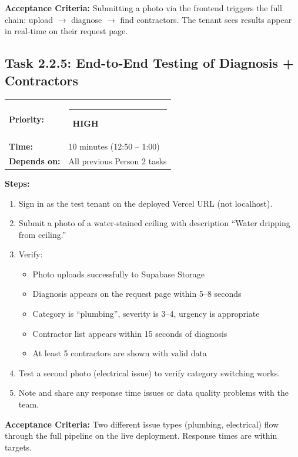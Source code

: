 \documentclass[11pt, a4paper]{article}
\newcommand{\highpri}{\textcolor{highamber}{\rule{6pt}{6pt}}~\textcolor{highamber}{\scriptsize\textbf{HIGH}}}
\begin{document}
\textbf{Acceptance Criteria:} Submitting a photo via the frontend triggers the full chain: upload $\rightarrow$ diagnose $\rightarrow$ find contractors. The tenant sees results appear in real-time on their request page.

\vspace{1em}

\subsection{Task 2.2.5: End-to-End Testing of Diagnosis + Contractors}

\begin{tabularx}{\textwidth}{lX}
\textbf{Priority:} & \highpri \\
\textbf{Time:} & 10 minutes (12:50 -- 1:00) \\
\textbf{Depends on:} & All previous Person 2 tasks \\
\end{tabularx}

\vspace{0.3em}

\textbf{Steps:}
\begin{enumerate}[leftmargin=2em, itemsep=2pt]
  \item Sign in as the test tenant on the deployed Vercel URL (not localhost).
  \item Submit a photo of a water-stained ceiling with description ``Water dripping from ceiling.''
  \item Verify:
    \begin{itemize}[itemsep=1pt]
      \item Photo uploads successfully to Supabase Storage
      \item Diagnosis appears on the request page within 5--8 seconds
      \item Category is ``plumbing'', severity is 3--4, urgency is appropriate
      \item Contractor list appears within 15 seconds of diagnosis
      \item At least 5 contractors are shown with valid data
    \end{itemize}
  \item Test a second photo (electrical issue) to verify category switching works.
  \item Note and share any response time issues or data quality problems with the team.
\end{enumerate}

\textbf{Acceptance Criteria:} Two different issue types (plumbing, electrical) flow through the full pipeline on the live deployment. Response times are within targets.
\end{document}
